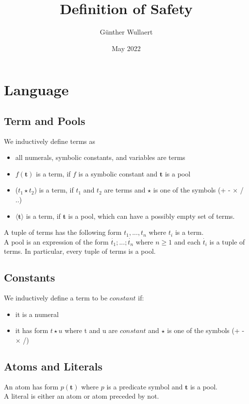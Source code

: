 \documentclass{article}
\title{Definition of Safety}
\author{Günther Wullaert}
\date{May 2022}
\newcommand{\pool}[1]{\boldsymbol{#1}}
\newcommand{\tuple}[1]{\dot{#1}}
\begin{document}
	\maketitle
	
	\section{Language}
	\subsection{Term and Pools}
	
	We inductively define terms as
	\begin{itemize}
		\item all numerals, symbolic constants, and variables are terms 
		\item $f(\pool{t})$ is a term, if $f$ is a symbolic constant and $\pool{t}$ is a pool
		\item ($t_1 \star t_2$) is a term, if $t_1$ and $t_2$ are terms and $\star$ is one of the symbols (+ - × / ..)
		\item $\langle \pool{t} \rangle$ is a term, if $\pool{t}$ is a pool, which can have a possibly empty set of terms.
	\end{itemize}
	A tuple of terms has the following form $t_1,...,t_n$ where $t_i$ is a term.
	\\
	A pool is an expression of the form $\tuple{t_1};...;\tuple{t_n}$ where $n \ge 1$ and each $\tuple{t_i}$ is a tuple of terms. 
	In particular, every tuple of terms is a pool.

	\subsection{Constants}

	We inductively define a term to be $\mathit{constant}$ if:
	\begin{itemize}
		\item it is a numeral
		\item it has form $t \star u$ where t and u are $\mathit{constant}$ and $\star$ is one of the symbols (+ - × /)
	\end{itemize}

	\subsection{Atoms and Literals}
	
	An atom has form $p(\pool{t})$ where $p$ is a predicate symbol and $\pool{t}$ is a pool. 
	\\
	A literal is either an atom or atom preceded by not.
\end{document}
